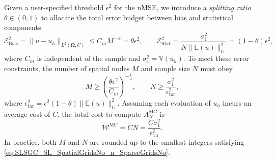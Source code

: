 Given a user-specified threshold $\epsilon^2$  for the nMSE, we introduce a {\it splitting ratio} $\theta \in (0,1)$ to allocate the total error budget between bias and statistical components
%
\begin{equation} \label{eq:error-budget}
\mathcal{E}_{\text{Bias}}^2=\|u-u_h\|_{L^2(\boldsymbol \Omega,U)}\le C_mM^{-\alpha}= \theta\epsilon^2, \quad\quad \mathcal{E}_{\text{Stat}}^2 = \frac{\sigma_1^2}{N \big\| \mathbb{E}(u)  \big\| _{U}^2}=(1-\theta)\epsilon^2,
\end{equation}
where $C_m$ is independent of the sample and $\sigma_1^2 = \mathbb{V}\left( u_{h}\right)$. To meet these error constraints, the number of spatial nodes $M$ and sample size $N$ must obey
%
\begin{equation}
\label{eq:SLSGC_SL_SpatialGridsNo_n_SparseGridsNo}
M\ge \left(\frac{\theta\epsilon^2}{C_m}\right)^{-\frac 1 {\alpha}},\quad\quad  N \ge  \frac{\sigma_1^2}{\epsilon_{\text{tar}}^2},
\end{equation}
%
where $\epsilon_{\text{tar}}^2 = \epsilon^2(1-\theta) \big\| \mathbb{E}(u)  \big\| _{U}^2$.
Assuming each evaluation of $u_{h}$ incurs an average cost of $C$, the total cost to compute $A^{\text{MC}}_{N}$ is
%
\[
\mathcal{W}^\text{MC}  = CN=\frac{C\sigma_1^2}{\epsilon_{\text{tar}}^2}.
\]
%
In practice, both $M$ and $N$ are rounded up to the smallest integers satisfying \eqref{eq:SLSGC_SL_SpatialGridsNo_n_SparseGridsNo}.